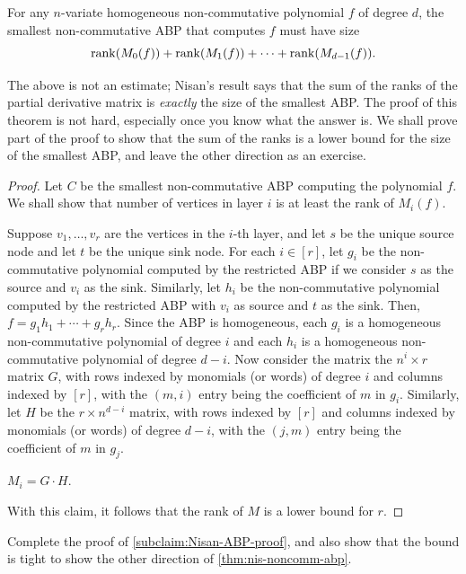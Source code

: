 \begin{theorem}\label{thm:nis-noncomm-abp}
For any $n$-variate homogeneous non-commutative polynomial $f$ of degree $d$, the smallest non-commutative ABP that computes $f$ must have size
\[
\operatorname{rank}(M_0(f)) + \operatorname{rank}(M_1(f)) +  \cdots + \operatorname{rank}(M_{d-1}(f)).
\]
\end{theorem}
The above is not an estimate; Nisan's result says that the sum of the ranks of the partial derivative matrix is \emph{exactly} the size of the smallest ABP.
The proof of this theorem is not hard, especially once you know what the answer is.
We shall prove part of the proof to show that the sum of the ranks is a lower bound for the size of the smallest ABP, and leave the other direction as an exercise.

\begin{proof}
Let $C$ be the smallest non-commutative ABP computing the polynomial $f$. We shall show that number of vertices in layer $i$ is at least the rank of $M_i(f)$. 

Suppose $v_1,\ldots, v_r$ are the vertices in the $i$-th layer, and let $s$ be the unique source node and let $t$ be the unique sink node.
For each $i \in [r]$, let $g_i$ be the non-commutative polynomial computed by the restricted ABP if we consider $s$ as the source and $v_i$ as the sink.
Similarly, let $h_i$ be the non-commutative polynomial computed by the restricted ABP with $v_i$ as source and $t$ as the sink.
Then, $f = g_1 h_1 + \cdots + g_r h_r$.
Since the ABP is homogeneous, each $g_i$ is a homogeneous non-commutative polynomial of degree $i$ and each $h_i$ is a homogeneous non-commutative polynomial of degree $d-i$.
Now consider the matrix the $n^i \times r$ matrix $G$, with rows indexed by monomials (or words) of degree $i$ and columns indexed by $[r]$, with the $(m,i)$ entry being the coefficient of $m$ in $g_i$.
Similarly, let $H$ be the $r \times n^{d-i}$ matrix, with rows indexed by $[r]$ and columns indexed by monomials (or words) of degree $d-i$, with the $(j,m)$ entry being the coefficient of $m$ in $g_j$.
\begin{subclaim}\label{subclaim:Nisan-ABP-proof}
$M_i = G \cdot H$. 
\end{subclaim}
\noindent 
With this claim, it follows that the rank of $M$ is a lower bound for $r$. 
\end{proof}

\begin{exercise}
Complete the proof of  \autoref{subclaim:Nisan-ABP-proof}, and also show that the bound is tight to show the other direction of \autoref{thm:nis-noncomm-abp}. 
\end{exercise}

